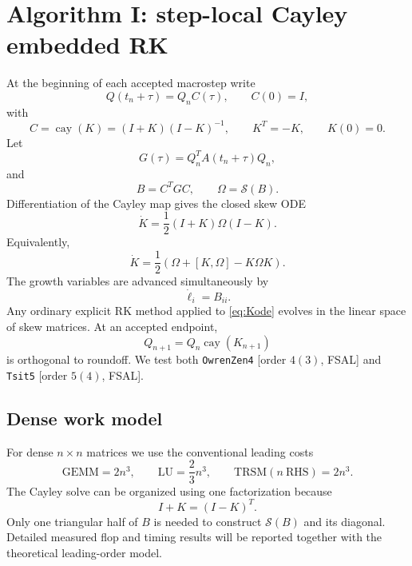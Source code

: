 \documentclass[11pt]{article}
\newcommand{\Sop}{\mathcal{S}}
\newcommand{\cay}{\operatorname{cay}}
\begin{document}
\section{Algorithm I: step-local Cayley embedded RK}
At the beginning of each accepted macrostep write
\begin{equation}
 Q(t_n+\tau)=Q_n C(\tau),\qquad C(0)=I,
 \label{eq:localQ}
\end{equation}
with
\begin{equation}
 C=\cay(K)=(I+K)(I-K)^{-1},\qquad K^T=-K,\qquad K(0)=0.
 \label{eq:cayley}
\end{equation}
Let
\begin{equation}
 G(\tau)=Q_n^TA(t_n+\tau)Q_n,
 \label{eq:G}
\end{equation}
and
\begin{equation}
 B=C^TG C,\qquad \Omega=\Sop(B).
 \label{eq:localB}
\end{equation}
Differentiation of the Cayley map gives the closed skew ODE
\begin{equation}
 \boxed{\dot K=\frac12(I+K)\Omega(I-K)}.
 \label{eq:Kode}
\end{equation}
Equivalently,
\begin{equation}
 \boxed{\dot K=\frac12\left(\Omega+[K,\Omega]-K\Omega K\right)}.
 \label{eq:KodeExpanded}
\end{equation}
The growth variables are advanced simultaneously by
\begin{equation}
 \dot\ell_i=B_{ii}.
 \label{eq:localgrowth}
\end{equation}
Any ordinary explicit RK method applied to \eqref{eq:Kode} evolves in the linear space of skew matrices. At an accepted endpoint,
\begin{equation}
 Q_{n+1}=Q_n\cay(K_{n+1})
 \label{eq:rkendpoint}
\end{equation}
is orthogonal to roundoff. We test both \texttt{OwrenZen4} [order $4(3)$, FSAL] and \texttt{Tsit5} [order $5(4)$, FSAL].

\subsection{Dense work model}
For dense $n\times n$ matrices we use the conventional leading costs
\begin{equation}
 \mathrm{GEMM}=2n^3,\qquad \mathrm{LU}=\frac23n^3,
 \qquad \mathrm{TRSM}(n\ \mathrm{RHS})=2n^3.
 \label{eq:flops}
\end{equation}
The Cayley solve can be organized using one factorization because
\begin{equation}
 I+K=(I-K)^T.
 \label{eq:transposeShift}
\end{equation}
Only one triangular half of $B$ is needed to construct $\Sop(B)$ and its diagonal. Detailed measured flop and timing results will be reported together with the theoretical leading-order model.
\end{document}
